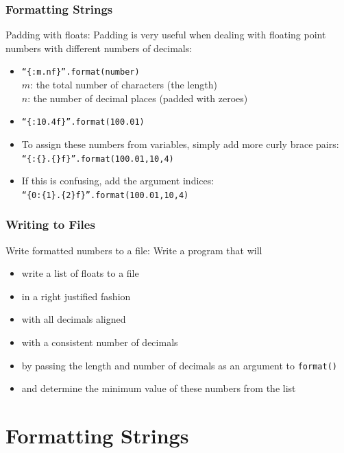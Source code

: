 \documentclass{beamer}
\newcommand{\code}[1]{\texttt{#1}}
\begin{document}
\begin{frame}	
	\frametitle{Formatting Strings}
	
	\begin{block}{Padding with floats:}
		Padding is very useful when dealing with floating point numbers with different numbers of decimals:
		\begin{itemize}
			\item \code{``\{:$m$.$n$f\}''.format(number)} \\
					$m$: the total number of characters (the length) \\
					$n$: the number of decimal places (padded with zeroes)
			\item \code{``\{:10.4f\}''.format(100.01)}
			\item To assign these numbers from variables, simply add more curly brace pairs: \\
					\code{``\{:\{\}.\{\}f\}''.format(100.01,10,4)}
			\item If this is confusing, add the argument indices: \\
					\code{``\{0:\{1\}.\{2\}f\}''.format(100.01,10,4)}
		\end{itemize}
	\end{block}
	
\end{frame}

\begin{frame}	
	\frametitle{Writing to Files}
	
	\begin{exampleblock}{Write formatted numbers to a file:}
		Write a program that will
		\begin{itemize}
			\item write a list of floats to a file
			\item in a right justified fashion
			\item with all decimals aligned
			\item with a consistent number of decimals
			\item by passing the length and number of decimals as an argument to \code{format()}
			\item and determine the minimum value of these numbers from the list
		\end{itemize}
	\end{exampleblock}
	
\end{frame}


\section{Formatting Strings}
\end{document}
